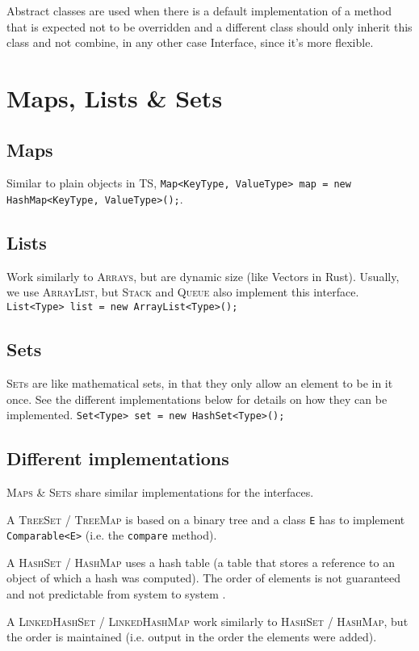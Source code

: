 Abstract classes are used when there is a default implementation of a method that is expected not to be overridden and a different class should only inherit this class and not combine, in any other case Interface, since it's more flexible.

\newsection
\section{Maps, Lists \& Sets}


\subsection{Maps}
Similar to plain objects in TS, \texttt{Map<KeyType, ValueType> map = new HashMap<KeyType, ValueType>();}.

\subsection{Lists}
Work similarly to \textsc{Arrays}, but are dynamic size (like Vectors in Rust). Usually, we use \textsc{ArrayList}, but \textsc{Stack} and \textsc{Queue} also implement this interface.
\texttt{List<Type> list = new ArrayList<Type>();}

\subsection{Sets}
\textsc{Set}s are like mathematical sets, in that they only allow an element to be in it once. See the different implementations below for details on how they can be implemented.
\texttt{Set<Type> set = new HashSet<Type>();}


\subsection{Different implementations}
\textsc{Maps} \& \textsc{Sets} share similar implementations for the interfaces. 

A \textsc{TreeSet} / \textsc{TreeMap} is based on a binary tree and a class \texttt{E} has to implement \texttt{Comparable<E>} (i.e. the \texttt{compare} method). \timecomplexity {}

A \textsc{HashSet} / \textsc{HashMap} uses a hash table (a table that stores a reference to an object of which a hash was computed). The order of elements is not guaranteed and not predictable from system to system \timecomplexity {}.

A \textsc{LinkedHashSet} / \textsc{LinkedHashMap} work similarly to \textsc{HashSet} / \textsc{HashMap}, but the order is maintained (i.e. output in the order the elements were added). \timecomplexity {}


